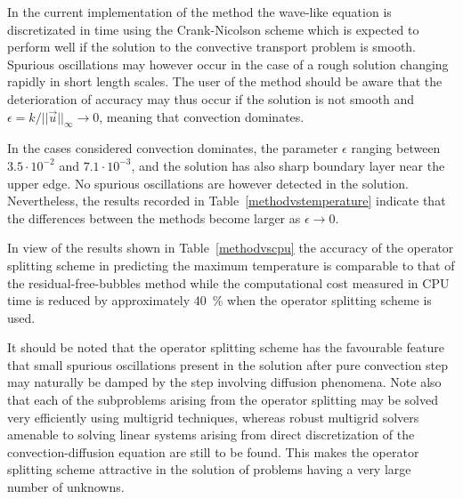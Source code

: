 In the current implementation of the method the 
wave-like equation is discretizated in time
using the Crank-Nicolson scheme which is expected to perform well if 
the solution to the convective transport problem is smooth. Spurious
oscillations may however occur in the case of a rough solution changing 
rapidly in short length scales. The user of the method should be
aware that the deterioration of accuracy may thus occur if the solution is
not smooth and $\epsilon=k/||\vec u ||_\infty \longrightarrow 0$,
meaning that convection dominates.  
   
In the cases considered convection dominates, the parameter $\epsilon$ 
ranging between $3.5\cdot 10^{-2}$ and $7.1\cdot 10^{-3}$,
and the solution has also sharp boundary 
layer near the upper edge. No spurious oscillations are however detected in
the solution. Nevertheless, the results recorded in 
Table~\ref{methodvstemperature} indicate that the differences between the
methods become larger as $\epsilon \longrightarrow 0$. 
 
In view of the results shown in Table~\ref{methodvscpu} the accuracy of the 
operator splitting scheme in predicting the maximum temperature is comparable 
to that of the residual-free-bubbles method while the computational 
cost measured in CPU time is reduced by approximately 40~\% when 
the operator splitting scheme is used. 

It should be noted that the operator splitting scheme has 
the favourable feature that small spurious oscillations present in the 
solution after pure convection step may naturally be damped by the step 
involving diffusion phenomena. Note also that each of the subproblems arising 
from the operator splitting may be
solved very efficiently using multigrid techniques, whereas robust multigrid 
solvers amenable to solving linear systems arising from direct discretization 
of the convection-diffusion equation are still to be found. This makes 
the operator splitting scheme attractive in the solution of problems 
having a very large number of unknowns.   







